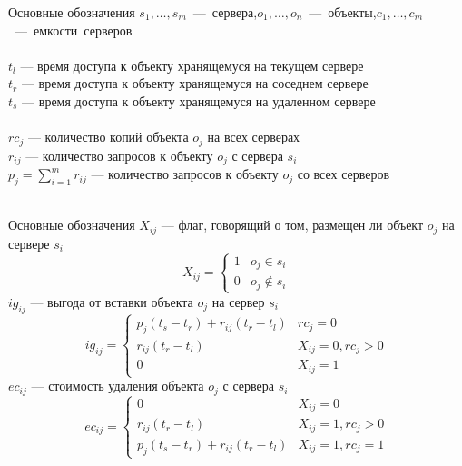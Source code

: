 \documentclass{beamer}
\begin{document}
\begin{frame}[fragile]{Основные обозначения}
	$s_1, \ldots, s_m$~---~сервера,\quad$o_1, \ldots, o_n$~---~объекты,\quad$c_1, \ldots, c_m$~---~емкости~серверов\\~\\
	
	$t_l$ --- время доступа к объекту хранящемуся на текущем сервере\\
	$t_r$ --- время доступа к объекту хранящемуся на соседнем сервере\\
	$t_s$ --- время доступа к объекту хранящемуся на удаленном сервере\\~\\

	$rc_j$ --- количество копий объекта $o_j$ на всех серверах\\
	$r_{ij}$ --- количество запросов к объекту $o_j$ с сервера $s_i$\\
	$p_j = \sum_{i=1}^{m} r_{ij}$ --- количество запросов к объекту $o_j$ со всех серверов\\~\\
\end{frame}

\begin{frame}[fragile]{Основные обозначения}
	$X_{ij}$ --- флаг, говорящий о том, размещен ли объект $o_j$ на сервере $s_i$
	\[ 	
		X_{ij} =
		\begin{cases} 
			1 & o_j \in s_i \\ 
			0 & o_j \notin s_i 
		\end{cases}
	\] 
	$ig_{ij}$ --- выгода от вставки объекта $o_j$ на сервер $s_i$
	\[ 	
		ig_{ij} =
		\begin{cases} 
			p_j (t_s - t_r) + r_{ij} (t_r - t_l) 	& rc_j = 0 \\
			r_{ij} (t_r - t_l) 						& X_{ij} = 0, rc_j > 0 \\
			0 										& X_{ij} = 1 
		\end{cases}
	\] 
	$ec_{ij}$ --- стоимость удаления объекта $o_j$ с сервера $s_i$
	\[ 	
		ec_{ij} =
		\begin{cases} 
			0										& X_{ij} = 0 \\
			r_{ij} (t_r - t_l) 						& X_{ij} = 1, rc_j > 0 \\
			p_j (t_s - t_r) + r_{ij} (t_r - t_l)	& X_{ij} = 1, rc_j = 1 
		\end{cases}
	\] 
\end{frame}
\end{document}
